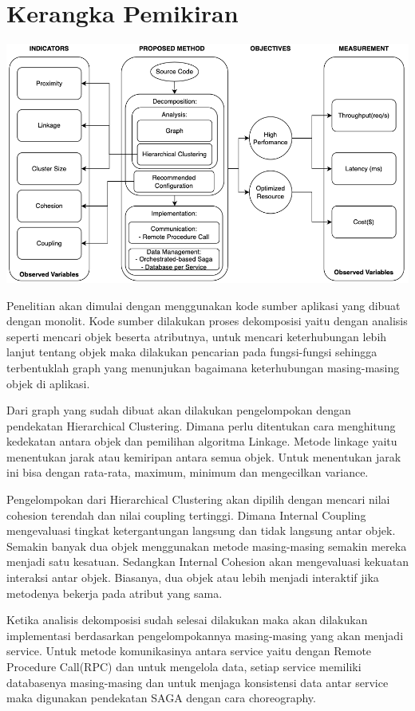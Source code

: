 \section{Kerangka Pemikiran}
\begin{center}
	\includegraphics[width=14cm]{img/KerangkaPemikiran.png}
	\label{fig:asd}
\end{center}

Penelitian akan dimulai dengan menggunakan kode sumber aplikasi yang dibuat dengan monolit. Kode sumber dilakukan proses dekomposisi yaitu dengan analisis seperti mencari objek beserta atributnya, untuk mencari keterhubungan lebih lanjut tentang objek maka dilakukan pencarian pada fungsi-fungsi sehingga terbentuklah graph yang menunjukan bagaimana keterhubungan masing-masing objek di aplikasi.

Dari graph yang sudah dibuat akan dilakukan pengelompokan dengan pendekatan Hierarchical Clustering. Dimana perlu ditentukan cara menghitung kedekatan antara objek dan pemilihan algoritma Linkage. Metode linkage yaitu menentukan jarak atau kemiripan antara semua objek. Untuk menentukan jarak ini bisa dengan rata-rata, maximum, minimum dan mengecilkan variance.

Pengelompokan dari Hierarchical Clustering akan dipilih dengan mencari nilai cohesion terendah dan  nilai coupling tertinggi. Dimana Internal Coupling mengevaluasi tingkat ketergantungan langsung dan tidak langsung antar objek. Semakin banyak dua objek menggunakan metode masing-masing semakin mereka menjadi satu kesatuan. Sedangkan Internal Cohesion akan mengevaluasi kekuatan interaksi antar objek. Biasanya, dua objek atau lebih menjadi interaktif jika metodenya bekerja pada atribut yang sama.

Ketika analisis dekomposisi sudah selesai dilakukan maka akan dilakukan implementasi berdasarkan pengelompokannya masing-masing yang akan menjadi service. Untuk metode komunikasinya antara service yaitu dengan Remote Procedure Call(RPC) dan untuk mengelola data, setiap service memiliki databasenya masing-masing dan untuk menjaga konsistensi data antar service maka digunakan pendekatan SAGA dengan cara choreography.

